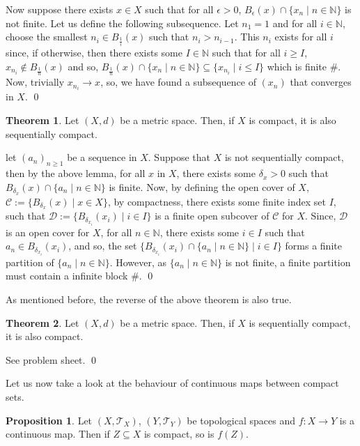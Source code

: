 \documentclass[
]{article}
\theoremstyle{definition}
\newtheorem{theorem}{Theorem}
\newtheorem{prop}{Proposition}
\theoremstyle{definition}
\begin{document}
Now suppose there exists \(x \in X\) such that for all \(\epsilon > 0\),
\(B_\epsilon(x) \cap \{x_n \mid n \in \mathbb{N}\}\) is not finite. Let
us define the following subsequence. Let \(n_1 = 1\) and for all
\(i \in \mathbb{N}\), choose the smallest \(n_i \in B_{\frac{1}{i}}(x)\)
such that \(n_i > n_{i - 1}\). This \(n_i\) exists for all \(i\) since,
if otherwise, then there exists some \(I \in \mathbb{N}\) such that for
all \(i \ge I\), \(x_{n_i} \not\in B_{\frac{1}{n}}(x)\) and so,
\(B_{\frac{1}{n}}(x) \cap \{x_n \mid n \in \mathbb{N}\} \subseteq  \{x_{n_i} \mid i \le I\}\)
which is finite \#. Now, trivially \(x_{n_i} \to x\), so, we have found
a subsequence of \((x_n)\) that converges in \(X\). \qed

\begin{theorem}
  Let \((X, d)\) be a metric space. Then, if \(X\) is compact, it is also 
  sequentially compact.
\end{theorem}
\proof

let \((a_n)_{n \ge 1}\) be a sequence in \(X\). Suppose that \(X\) is
not sequentially compact, then by the above lemma, for all \(x\) in
\(X\), there exists some \(\delta_x > 0\) such that
\(B_{\delta_x}(x) \cap \{a_n \mid n \in \mathbb{N}\}\) is finite. Now,
by defining the open cover of \(X\),
\(\mathcal{C} :=  \{B_{\delta_x}(x) \mid x \in X\}\), by compactness,
there exists some finite index set \(I\), such that
\(\mathcal{D} := \{B_{\delta_{x_i}}(x_i) \mid i \in I\}\) is a finite
open subcover of \(\mathcal{C}\) for \(X\). Since, \(\mathcal{D}\) is an
open cover for \(X\), for all \(n \in \mathbb{N}\), there exists some
\(i \in I\) such that \(a_n \in B_{\delta_{x_i}}(x_i)\), and so, the set
\(\{B_{\delta_{x_i}}(x_i) \cap \{a_n \mid n \in \mathbb{N}\} \mid i \in I\}\)
forms a finite partition of \(\{a_n \mid n \in \mathbb{N}\}\). However,
as \(\{a_n \mid n \in \mathbb{N}\}\) is not finite, a finite partition
must contain a infinite block \#. \qed

As mentioned before, the reverse of the above theorem is also true.

\begin{theorem}
  Let \((X, d)\) be a metric space. Then, if \(X\) is sequentially compact, it 
  is also compact.
\end{theorem}
\proof

See problem sheet. \qed

Let us now take a look at the behaviour of continuous maps between
compact sets.

\begin{prop}
  Let \((X, \mathcal{T}_X)\), \((Y, \mathcal{T}_Y)\) be topological spaces and 
  \(f : X \to Y\) is a continuous map. Then if \(Z \subseteq X\) is compact, 
  so is \(f(Z)\).
\end{prop}
\proof
\end{document}
